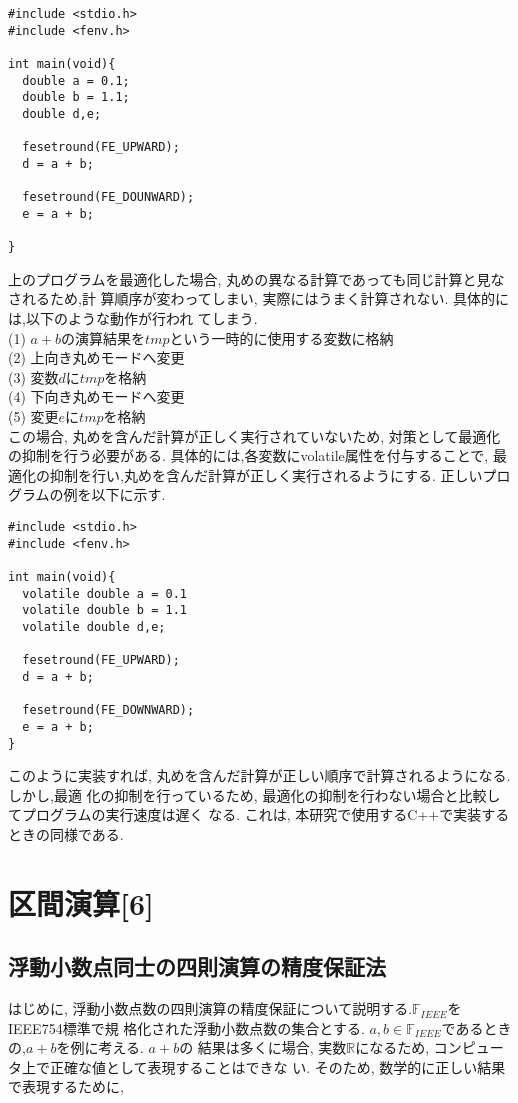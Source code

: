 \documentclass[11pt,a4paper]{jsreport}
\theoremstyle{definition}
\begin{document}
\begin{lstlisting}[caption = 丸めモード変更を用いたプログラム(正しくない例)]
#include <stdio.h>
#include <fenv.h>

int main(void){
  double a = 0.1;
  double b = 1.1;
  double d,e;

  fesetround(FE_UPWARD);
  d = a + b;

  fesetround(FE_DOUNWARD);
  e = a + b;

}
\end{lstlisting}
  上のプログラムを最適化した場合, 丸めの異なる計算であっても同じ計算と見なされるため,計
算順序が変わってしまい, 実際にはうまく計算されない. 具体的には,以下のような動作が行われ
てしまう.
\\
	(1) $a + b$の演算結果を$tmp$という一時的に使用する変数に格納 \\
	(2) 上向き丸めモードへ変更 \\
	(3) 変数$d$に$tmp$を格納 \\
	(4) 下向き丸めモードへ変更 \\
	(5) 変更$e$に$tmp$を格納 \\
この場合, 丸めを含んだ計算が正しく実行されていないため, 対策として最適化の抑制を行う必要がある. 具体的には,各変数にvolatile属性を付与することで, 最適化の抑制を行い,丸めを含んだ計算が正しく実行されるようにする. 正しいプログラムの例を以下に示す.
\begin{lstlisting}[caption = 丸めモード変更を用いたプログラム(正しい例)]
#include <stdio.h>
#include <fenv.h>

int main(void){
  volatile double a = 0.1
  volatile double b = 1.1
  volatile double d,e;

  fesetround(FE_UPWARD);
  d = a + b;

  fesetround(FE_DOWNWARD);
  e = a + b;
}
\end{lstlisting}
  このように実装すれば, 丸めを含んだ計算が正しい順序で計算されるようになる. しかし,最適
化の抑制を行っているため, 最適化の抑制を行わない場合と比較してプログラムの実行速度は遅く
なる. これは, 本研究で使用するC++で実装するときの同様である.
\section{区間演算[6]}
\subsection{浮動小数点同士の四則演算の精度保証法}
  はじめに, 浮動小数点数の四則演算の精度保証について説明する.$\mathbb{F}_{IEEE}$をIEEE754標準で規
格化された浮動小数点数の集合とする. $a,b \in \mathbb{F}_{IEEE}$であるときの,$a + b$を例に考える. $a + b$の
結果は多くに場合, 実数$\mathbb{R}$になるため, コンピュータ上で正確な値として表現することはできな
い. そのため, 数学的に正しい結果で表現するために,
\end{document}
